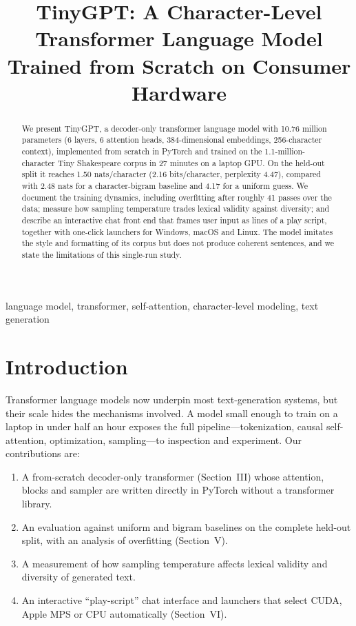 \documentclass[conference]{IEEEtran}
\begin{document}
\title{TinyGPT: A Character-Level Transformer Language Model Trained from Scratch on Consumer Hardware}

\author{
}

\maketitle

\begin{abstract}
We present TinyGPT, a decoder-only transformer language model with 10.76 million parameters (6 layers, 6 attention heads,
384-dimensional embeddings, 256-character context), implemented from scratch in PyTorch and trained on the 1.1-million-character
Tiny Shakespeare corpus in 27 minutes on a laptop GPU. On the held-out split it reaches 1.50 nats/character (2.16 bits/character,
perplexity 4.47), compared with 2.48 nats for a character-bigram baseline and 4.17 for a uniform guess. We document the training
dynamics, including overfitting after roughly 41 passes over the data; measure how sampling temperature trades lexical validity
against diversity; and describe an interactive chat front end that frames user input as lines of a play script, together with
one-click launchers for Windows, macOS and Linux. The model imitates the style and formatting of its corpus but does not produce
coherent sentences, and we state the limitations of this single-run study.
\end{abstract}

\begin{IEEEkeywords}
language model, transformer, self-attention, character-level modeling, text generation
\end{IEEEkeywords}

\section{Introduction}
Transformer language models \cite{vaswani2017,radford2019} now underpin most text-generation systems, but their scale hides the
mechanisms involved. A model small enough to train on a laptop in under half an hour exposes the full pipeline---tokenization,
causal self-attention, optimization, sampling---to inspection and experiment. Our contributions are:
\begin{enumerate}
\item A from-scratch decoder-only transformer (Section~III) whose attention, blocks and sampler are written directly in
PyTorch \cite{paszke2019} without a transformer library.
\item An evaluation against uniform and bigram baselines on the complete held-out split, with an analysis of overfitting
(Section~V).
\item A measurement of how sampling temperature affects lexical validity and diversity of generated text.
\item An interactive ``play-script'' chat interface and launchers that select CUDA, Apple MPS or CPU automatically (Section~VI).
\end{enumerate}
\end{document}
